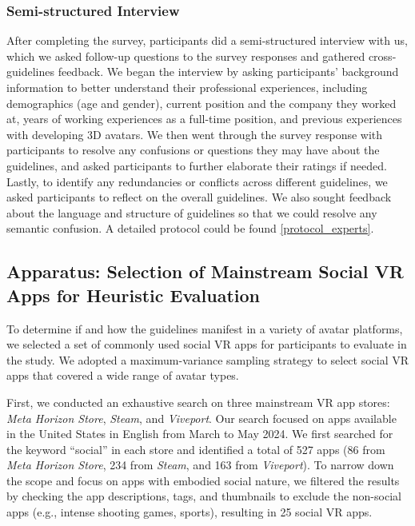 \subsubsection{Semi-structured Interview} 
After completing the survey, participants did a semi-structured interview with us, which we asked follow-up questions to the survey responses and gathered cross-guidelines feedback. We began the interview by asking participants' background information to better understand their professional experiences, including demographics (age and gender), current position and the company they worked at, years of working experiences as a full-time position, and previous experiences with developing 3D avatars. We then went through the survey response with participants to resolve any confusions or questions they may have about the guidelines, and asked participants to further elaborate their ratings if needed. %
Lastly, to identify any redundancies or conflicts across different guidelines, we asked participants to reflect on the overall guidelines. We also sought feedback about the language and structure of guidelines so that we could resolve any semantic confusion. A detailed protocol could be found \ref{protocol_experts}. %

\subsection{Apparatus: Selection of Mainstream Social VR Apps for Heuristic Evaluation}\label{sec:appselect}
To determine if and how the guidelines manifest in a variety of avatar platforms, we selected a set of commonly used social VR apps for participants to evaluate in the study. We adopted a maximum-variance sampling strategy \cite{maxwell2012qualitative, human_ai_guidelines} to select social VR apps that covered a wide range of avatar types. 

First, we conducted an exhaustive search on three mainstream VR app stores: \textit{Meta Horizon Store}, \textit{Steam}, and \textit{Viveport}. Our search focused on apps available in the United States in English from March to May 2024. We first searched for the keyword ``social'' in each store and identified a total of 527 apps (86 from \textit{Meta Horizon Store}, 234 from \textit{Steam}, and 163 from \textit{Viveport}). To narrow down the scope and focus on apps with embodied social nature, we filtered the results by checking the app descriptions, tags, and thumbnails to exclude the non-social apps (e.g., intense shooting games, sports), resulting in 25 social VR apps. 


